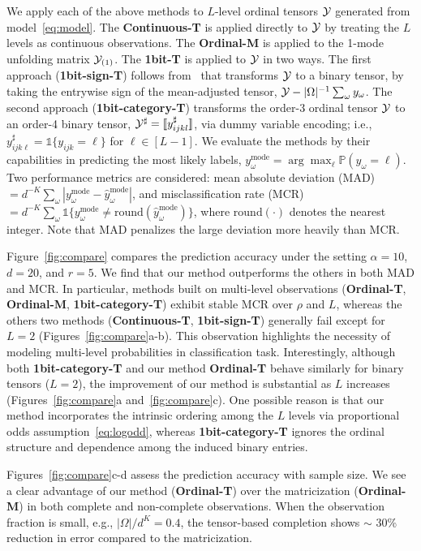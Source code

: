 \documentclass{article}
\theoremstyle{plain}
\theoremstyle{definition}
\begin{document}
We apply each of the above methods to $L$-level ordinal tensors $\mathcal{Y}$ generated from model~\eqref{eq:model}. The {\bf Continuous-T} is applied directly to $\mathcal{Y}$ by treating the $L$ levels as continuous observations. The {\bf Ordinal-M} is applied to the 1-mode unfolding matrix $\mathcal{Y}_{(1)}$. The {\bf 1bit-T} is applied to $\mathcal{Y}$ in two ways. The first approach ({\bf 1bit-sign-T}) follows from~\citet{ghadermarzy2018learning} that transforms
$\mathcal{Y}$ to a binary tensor, by taking the entrywise sign of the mean-adjusted tensor, $\mathcal{Y}- |\Omega|^{-1}\sum_\omega y_\omega$. The second approach ({\bf 1bit-category-T}) transforms the order-3 ordinal tensor $\mathcal{Y}$ to an order-4 binary tensor, $\mathcal{Y}^{\sharp}=\llbracket y^{\sharp}_{ijkl} \rrbracket$, via dummy variable encoding; i.e., $y^{\sharp}_{ijk\ell}=\mathds{1}\{y_{ijk}=\ell\}$ for $\ell\in[L-1]$. We evaluate the methods by their capabilities in predicting the most likely labels, $y_\omega^{\text{mode}}=\arg\max_\ell\mathbb{P}(y_\omega=\ell)$. Two performance metrics are considered: mean absolute deviation (MAD) $=d^{-K}\sum_\omega |y_\omega^{\text{mode}}-\hat y_\omega^{\text{mode}}|$, and misclassification rate (MCR) $=d^{-K}\sum_\omega\mathds{1}\{y_\omega^{\text{mode}}\neq\text{round}(\hat y_\omega^{\text{mode}})\}$,
where $\text{round}(\cdot)$ denotes the nearest integer. Note that MAD penalizes the large deviation more heavily than MCR.


Figure~\ref{fig:compare} compares the prediction accuracy under the setting $\alpha=10$, $d=20$, and $r=5$. We find that our method outperforms the others in both MAD and MCR. In particular, methods built on multi-level observations ({\bf Ordinal-T}, {\bf Ordinal-M}, {\bf 1bit-category-T}) exhibit stable MCR over $\rho$ and $L$, whereas the others two methods ({\bf Continuous-T}, {\bf 1bit-sign-T}) generally fail except for $L=2$ (Figures~\ref{fig:compare}a-b). This observation highlights the necessity of modeling multi-level probabilities in classification task. Interestingly, although both {\bf 1bit-category-T} and our method {\bf Ordinal-T} behave similarly for binary tensors ($L=2$), the improvement of our method is substantial as $L$ increases (Figures~\ref{fig:compare}a and~\ref{fig:compare}c). One possible reason is that our method incorporates the intrinsic ordering among the $L$ levels via proportional odds assumption~\eqref{eq:logodd}, whereas {\bf 1bit-category-T} ignores the ordinal structure and dependence among the induced binary entries. 

Figures~\ref{fig:compare}c-d assess the prediction accuracy with sample size. We see a clear advantage of our method ({\bf Ordinal-T}) over the matricization ({\bf Ordinal-M}) in both complete and non-complete observations. When the observation fraction is small, e.g., ${|\Omega|/ d^K}=0.4$, the tensor-based completion shows $\sim$ 30\% reduction in error compared to the matricization.
\end{document}
